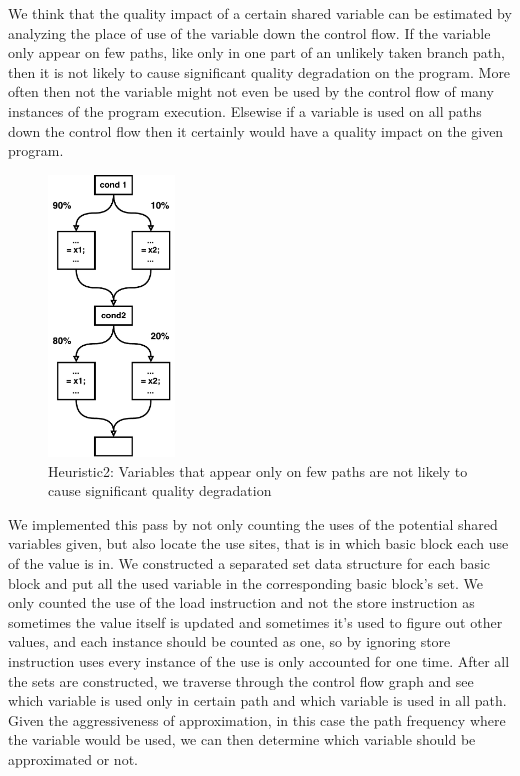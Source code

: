 \documentclass[12pt,conference]{IEEEtran}
\begin{document}
We think that the quality impact of a certain shared variable can be estimated
by analyzing the place of use of the variable down the control flow. If the 
variable only appear on few paths, like only in one part of an unlikely taken
branch path, then it is not likely to cause significant quality degradation
on the program. More often then not the variable might not even be used by the
control flow of many instances of the program execution. Elsewise if a variable
is used on all paths down the control flow then it certainly would have a
quality impact on the given program.
\begin{figure}[h]
    \centering
    \includegraphics[width=0.30\textwidth]{Heuristic2.pdf}
    \caption{Heuristic2: Variables that appear only on few paths are not likely to cause significant quality degradation}
    \label{fig:h2}
\end{figure}

We implemented this pass by not only counting the uses of the potential shared
variables given, but also locate the use sites, that is in which basic block each
use of the value is in. We constructed a separated set data structure for each 
basic block and put all the used variable in the corresponding basic block's set.
We only counted the use of the load instruction and not the store instruction as 
sometimes the value itself is updated and sometimes it's used to figure out other
values, and each instance should be counted as one, so by ignoring store instruction
uses every instance of the use is only accounted for one time. After all the sets
are constructed, we traverse through the control flow graph and see which variable
is used only in certain path and which variable is used in all path. Given the
aggressiveness of approximation, in this case the path frequency where the variable
would be used, we can then determine which variable should be approximated or not.
\end{document}
